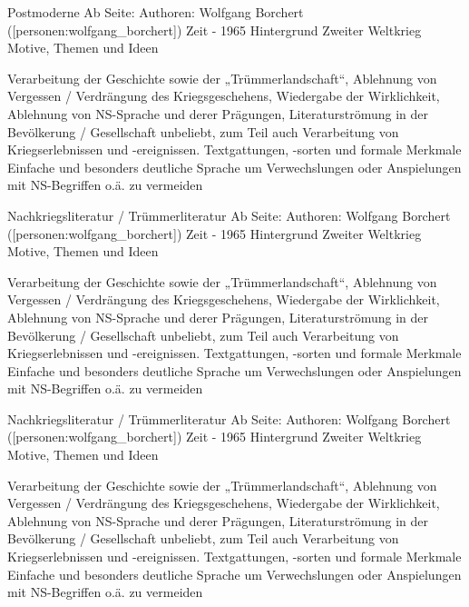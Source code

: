 \bTR
\bTD[nc=2] Postmoderne \eTD
\eTR
\bTR \bTD Ab Seite: \eTD \bTD {} \eTD \eTR
\bTR
\bTD Authoren: \eTD \bTD Wolfgang Borchert ([personen:wolfgang_borchert]) \eTD
\eTR
\bTR
\bTD Zeit \eTD {} - 1965 \eTD
\eTR
\bTR
\bTD Hintergrund \eTD \bTD Zweiter Weltkrieg \eTD
\eTR
\bTR
	\bTD
	Motive, Themen und Ideen 
	\eTD

	\bTD
	Verarbeitung der Geschichte sowie der „Trümmerlandschaft“, Ablehnung von Vergessen / Verdrängung des Kriegsgeschehens, Wiedergabe der Wirklichkeit, Ablehnung von NS-Sprache und derer Prägungen, Literaturströmung in der Bevölkerung / Gesellschaft unbeliebt, zum Teil auch Verarbeitung von Kriegserlebnissen und -ereignissen.
	\eTD
\eTR
\bTR
	\bTD
	Textgattungen, -sorten und formale Merkmale
	\eTD
	\bTD
	Einfache und besonders deutliche Sprache um Verwechslungen oder Anspielungen mit NS-Begriffen o.ä. zu vermeiden
	\eTD
\eTR

\bTR
\bTD[nc=2] Nachkriegsliteratur / Trümmerliteratur \eTD
\eTR
\bTR \bTD Ab Seite: \eTD \bTD {} \eTD \eTR
\bTR
\bTD Authoren: \eTD \bTD Wolfgang Borchert ([personen:wolfgang_borchert]) \eTD
\eTR
\bTR
\bTD Zeit \eTD {} - 1965 \eTD
\eTR
\bTR
\bTD Hintergrund \eTD \bTD Zweiter Weltkrieg \eTD
\eTR
\bTR
	\bTD
	Motive, Themen und Ideen 
	\eTD

	\bTD
	Verarbeitung der Geschichte sowie der „Trümmerlandschaft“, Ablehnung von Vergessen / Verdrängung des Kriegsgeschehens, Wiedergabe der Wirklichkeit, Ablehnung von NS-Sprache und derer Prägungen, Literaturströmung in der Bevölkerung / Gesellschaft unbeliebt, zum Teil auch Verarbeitung von Kriegserlebnissen und -ereignissen.
	\eTD
\eTR
\bTR
	\bTD
	Textgattungen, -sorten und formale Merkmale
	\eTD
	\bTD
	Einfache und besonders deutliche Sprache um Verwechslungen oder Anspielungen mit NS-Begriffen o.ä. zu vermeiden
	\eTD
\eTR

\bTR
\bTD[nc=2] Nachkriegsliteratur / Trümmerliteratur \eTD
\eTR
\bTR \bTD Ab Seite: \eTD \bTD {} \eTD \eTR
\bTR
\bTD Authoren: \eTD \bTD Wolfgang Borchert ([personen:wolfgang_borchert]) \eTD
\eTR
\bTR
\bTD Zeit \eTD {} - 1965 \eTD
\eTR
\bTR
\bTD Hintergrund \eTD \bTD Zweiter Weltkrieg \eTD
\eTR
\bTR
	\bTD
	Motive, Themen und Ideen 
	\eTD

	\bTD
	Verarbeitung der Geschichte sowie der „Trümmerlandschaft“, Ablehnung von Vergessen / Verdrängung des Kriegsgeschehens, Wiedergabe der Wirklichkeit, Ablehnung von NS-Sprache und derer Prägungen, Literaturströmung in der Bevölkerung / Gesellschaft unbeliebt, zum Teil auch Verarbeitung von Kriegserlebnissen und -ereignissen.
	\eTD
\eTR
\bTR
	\bTD
	Textgattungen, -sorten und formale Merkmale
	\eTD
	\bTD
	Einfache und besonders deutliche Sprache um Verwechslungen oder Anspielungen mit NS-Begriffen o.ä. zu vermeiden
	\eTD
\eTR
\eTABLE
\stopplacetable

